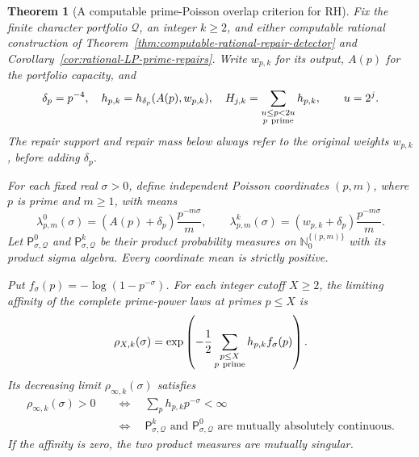 \documentclass[11pt]{article}
\newtheorem{theorem}{Theorem}[section]
\theoremstyle{definition}
\begin{document}
\begin{theorem}[A computable prime-Poisson overlap criterion for RH]
\label{thm:prime-Poisson-repair-RH}
Fix the finite character portfolio $\mathcal Q$, an integer
$k\ge2$, and either computable rational construction of
Theorem~\ref{thm:computable-rational-repair-detector} and
Corollary~\ref{cor:rational-LP-prime-repairs}.
Write $w_{p,k}$ for its output, $A(p)$ for the portfolio
capacity, and
\[
 \delta_p=p^{-4},\quad
 h_{p,k}=h_{\delta_p}(A(p),w_{p,k}),\quad
 H_{j,k}=\sum_{\substack{u\le p<2u\\p\ {\rm prime}}}h_{p,k},
 \qquad u=2^j.
\]
The repair support and repair mass below always refer to
the original weights $w_{p,k}$, before adding $\delta_p$.

For each fixed real $\sigma>0$, define independent Poisson
coordinates $(p,m)$, where $p$ is prime and $m\ge1$, with means
\begin{equation}
 \lambda^0_{p,m}(\sigma)
     =(A(p)+\delta_p)\frac{p^{-m\sigma}}m,\qquad
 \lambda^k_{p,m}(\sigma)
     =(w_{p,k}+\delta_p)\frac{p^{-m\sigma}}m.
 \label{eq:prime-Poisson-repair-means}
\end{equation}
Let $\mathsf P^0_{\sigma,\mathcal Q}$ and
$\mathsf P^k_{\sigma,\mathcal Q}$ be their product probability
measures on $\mathbb N_0^{\{(p,m)\}}$ with its product
sigma algebra. Every coordinate mean is strictly positive.

Put $f_\sigma(p)=-\log(1-p^{-\sigma})$.
For each integer cutoff $X\ge2$, the limiting affinity
of the complete prime-power laws at
primes $p\le X$ is
\begin{equation}
 \rho_{X,k}(\sigma)=
  \exp\left(-\frac12
       \sum_{\substack{p\le X\\p\ {\rm prime}}}
               h_{p,k}f_\sigma(p)\right).
 \label{eq:prime-Poisson-repair-affinity}
\end{equation}
Its decreasing limit $\rho_{\infty,k}(\sigma)$ satisfies
\begin{equation}
 \begin{aligned}
 \rho_{\infty,k}(\sigma)>0
 &\quad\Longleftrightarrow\quad
 \sum_p h_{p,k}p^{-\sigma}<\infty\\
 &\quad\Longleftrightarrow\quad
 \mathsf P^k_{\sigma,\mathcal Q}
           \text{ and }\mathsf P^0_{\sigma,\mathcal Q}
             \text{ are mutually absolutely continuous}.
 \end{aligned}
 \label{eq:prime-Poisson-repair-equivalence}
\end{equation}
If the affinity is zero, the two product measures are
mutually singular.


\end{theorem}
\end{document}

